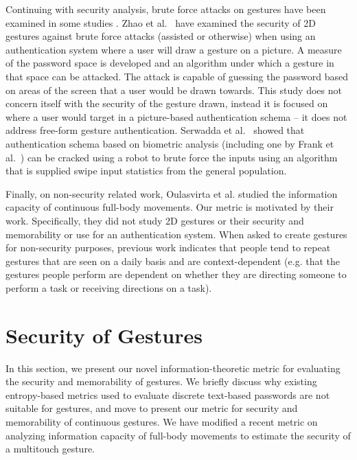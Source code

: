 \documentclass{sig-alternate-10pt}
\begin{document}
Continuing with security analysis, brute force attacks on gestures have been examined in some studies \cite{kinwrite,zhao:picturegesture,Biddle:2012:GPL:2333112.2333114}. Zhao et al.~\cite{zhao:picturegesture} have examined the security of 2D gestures against brute force attacks (assisted or otherwise) when using an authentication system where a user will draw a gesture on a picture. A measure of the password space is developed and an algorithm under which a gesture in that space can be attacked. The attack is capable of guessing the password based on areas of the screen that a user would be drawn towards. This study does not concern itself with the security of the gesture drawn, instead it is focused on where a user would target in a picture-based authentication schema -- it does not address free-form gesture authentication. Serwadda et al.~\cite{Serwadda:2013:KTB:2508859.2516659} showed that authentication schema based on biometric analysis (including one by Frank et al.~\cite{touchalytics}) can be cracked using a robot to brute force the inputs using an algorithm that is supplied swipe input statistics from the general population. 

Finally, on non-security related work, Oulasvirta et al. \cite{oulasvirta2013information} studied the information capacity of continuous full-body movements. Our metric is motivated by their work. Specifically, they did not study 2D gestures or their security and memorability or use for an authentication system. When asked to create gestures for non-security purposes, previous work \cite{Grandhi:2011:UNI:1978942.1979061, Oh:2013:CPE:2470654.2466145} indicates that  people tend to repeat gestures that are seen on a daily basis and are context-dependent (e.g. that the gestures people perform are dependent on whether they are directing someone to perform a task or receiving directions on a task).















\section{Security of Gestures}





In this section, we present our novel information-theoretic metric for evaluating the security and memorability of gestures. 
We briefly discuss why existing entropy-based metrics used to evaluate discrete text-based passwords \cite{Bonneau:2012:SGA:2310656.2310721} are
not suitable for gestures, and move to present our metric for security and memorability of continuous gestures. We have modified a recent
metric on analyzing information capacity of full-body movements \cite{oulasvirta2013information} to estimate the security of a multitouch gesture. 
\end{document}
